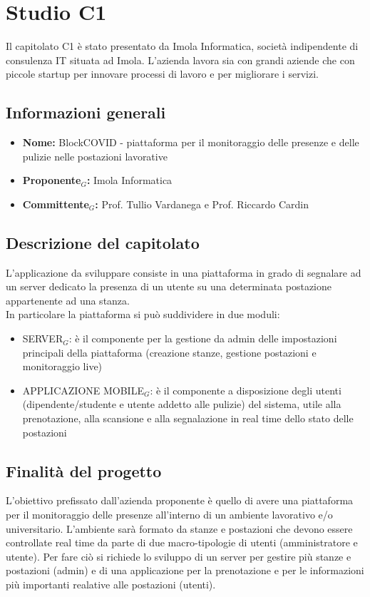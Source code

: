 \section{Studio C1}
Il capitolato C1 è stato presentato da Imola Informatica, società indipendente di consulenza IT situata ad Imola. L'azienda lavora sia con grandi aziende che con piccole startup per innovare processi di lavoro e per migliorare i servizi.\\

\subsection{Informazioni generali}
\begin{itemize}
	\item \textbf{Nome:} BlockCOVID - piattaforma per il monitoraggio delle presenze e delle pulizie nelle postazioni lavorative
	\item \textbf{Proponente$_G$:} Imola Informatica
	\item \textbf{Committente$_G$:} Prof. Tullio Vardanega e Prof. Riccardo Cardin
\end{itemize}

\subsection{Descrizione del capitolato}
L'applicazione da sviluppare consiste in una piattaforma in grado di segnalare ad un server dedicato la presenza di un utente su una determinata postazione appartenente ad una stanza. \\
In particolare la piattaforma si può suddividere in due moduli:
\begin{itemize}
	\item SERVER$_G$: è il componente per la gestione da admin delle impostazioni principali della piattaforma (creazione stanze, gestione postazioni e monitoraggio live)
	\item APPLICAZIONE MOBILE$_G$: è il componente a disposizione degli utenti (dipendente/studente e utente addetto alle pulizie) del sistema, utile alla prenotazione, alla scansione e alla segnalazione in real time dello stato delle postazioni 
\end{itemize}

\subsection{Finalità del progetto}
L'obiettivo prefissato dall'azienda proponente è quello di avere una piattaforma per il monitoraggio delle presenze all'interno di un ambiente lavorativo e/o universitario. L'ambiente sarà formato da stanze e postazioni che devono essere controllate real time da parte di due macro-tipologie di utenti (amministratore e utente). Per fare ciò si richiede lo sviluppo di un server per gestire più stanze e postazioni (admin) e di una applicazione per la prenotazione e per le informazioni più importanti realative alle postazioni (utenti).

